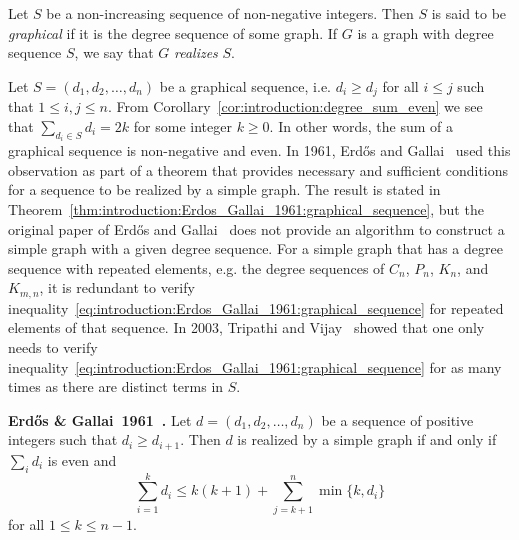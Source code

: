 Let $S$ be a non-increasing sequence of non-negative integers. Then
$S$ is said to be \emph{graphical} if it is the degree sequence of
some graph. If $G$ is a graph with degree sequence $S$, we say that
$G$ \emph{realizes} $S$.


Let $S = (d_1, d_2, \dots, d_n)$ be a graphical sequence, i.e.
$d_i \geq d_j$ for all $i \leq j$ such that $1 \leq i, j \leq n$. From
Corollary~\ref{cor:introduction:degree_sum_even} we see that
$\sum_{d_i \in S} d_i = 2k$ for some integer $k \geq 0$. In other
words, the sum of a graphical sequence is non-negative and
even. In 1961, Erd\H{o}s and Gallai~\cite{ErdosGallai1960} used this
observation as part of a theorem that provides necessary and
sufficient conditions for a sequence to be realized by a simple
graph. The result is stated in
Theorem~\ref{thm:introduction:Erdos_Gallai_1961:graphical_sequence},
but the original paper of Erd\H{o}s and Gallai~\cite{ErdosGallai1960}
does not provide an algorithm to construct a simple graph with a given
degree sequence. For a simple graph that has a degree sequence with
repeated elements, e.g. the degree sequences of $C_n$, $P_n$, $K_n$,
and $K_{m,n}$, it is redundant to verify
inequality~\eqref{eq:introduction:Erdos_Gallai_1961:graphical_sequence}
for repeated elements of that sequence. In 2003, Tripathi and
Vijay~\cite{TripathiVijay2003} showed that one only needs to verify
inequality~\eqref{eq:introduction:Erdos_Gallai_1961:graphical_sequence}
for as many times as there are distinct terms in $S$.

\begin{theorem}
\label{thm:introduction:Erdos_Gallai_1961:graphical_sequence}
\textbf{Erd\H{o}s \& Gallai~1961~\cite{ErdosGallai1960}.}
Let $d = (d_1, d_2, \dots, d_n)$ be a sequence of positive integers
such that $d_i \geq d_{i+1}$. Then $d$ is realized by a simple graph
if and only if $\sum_i d_i$ is even and
%
\begin{equation}
\label{eq:introduction:Erdos_Gallai_1961:graphical_sequence}
\sum_{i=1}^k d_i
\leq
k(k + 1) + \sum_{j=k+1}^n \min\{k, d_i\}
\end{equation}
%
for all $1 \leq k \leq n - 1$.
\end{theorem}

